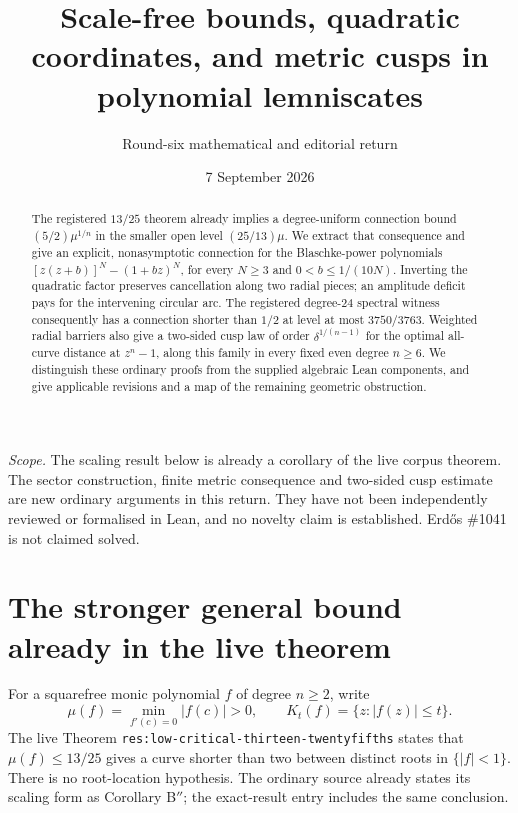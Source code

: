 \documentclass[11pt,a4paper]{article}
\title{Scale-free bounds, quadratic coordinates, and metric cusps in polynomial lemniscates}
\author{Round-six mathematical and editorial return}
\date{7 September 2026}
\theoremstyle{remark}\newtheorem{remark}[theorem]{Remark}
\begin{document}
\maketitle
\begin{abstract}
The registered $13/25$ theorem already implies a degree-uniform connection
bound $(5/2)\mu^{1/n}$ in the smaller open level $(25/13)\mu$.
We extract that consequence and give an explicit, nonasymptotic connection
for the Blaschke-power polynomials
$[z(z+b)]^N-(1+bz)^N$, for every $N\ge3$ and $0<b\le1/(10N)$.
Inverting the quadratic factor preserves cancellation along two radial
pieces; an amplitude deficit pays for the intervening circular arc.
The registered degree-24 spectral witness consequently has a connection
shorter than $1/2$ at level at most $3750/3763$.
Weighted radial barriers also give a two-sided cusp law of order
$\delta^{1/(n-1)}$ for the optimal all-curve distance at $z^n-1$, along this
family in every fixed even degree $n\ge6$.
We distinguish these ordinary proofs from the supplied algebraic Lean
components, and give applicable revisions and a map of the remaining
geometric obstruction.
\end{abstract}

\noindent\textit{Scope.} The scaling result below is already a corollary of
the live corpus theorem. The sector construction, finite metric consequence
and two-sided cusp estimate are new ordinary arguments in this return.
They have not been independently reviewed or formalised in Lean, and no
novelty claim is established. Erd\H{o}s \#1041 is not claimed solved.

\section{The stronger general bound already in the live theorem}

For a squarefree monic polynomial $f$ of degree $n\ge2$, write
\[
 \mu(f)=\min_{f'(c)=0}|f(c)|>0,\qquad K_t(f)=\{z:|f(z)|\le t\}.
\]
The live Theorem \texttt{res:low-critical-thirteen-twentyfifths} states that
$\mu(f)\le13/25$ gives a curve shorter than two between distinct roots in
$\{|f|<1\}$. There is no root-location hypothesis. The ordinary source
 already states its scaling form
as Corollary B$''$; the exact-result entry
 includes the same conclusion.
\end{document}
